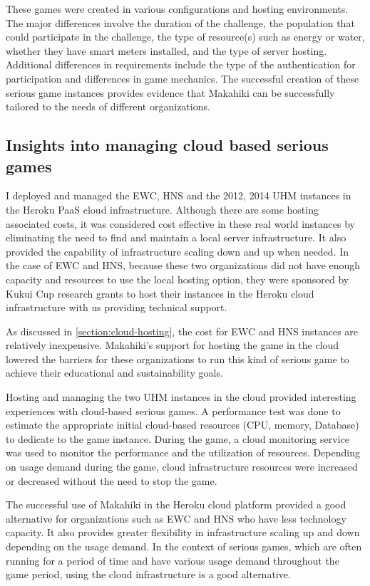 These games were created in various configurations and hosting environments. The major differences involve the duration of the challenge, the population that could participate in the challenge, the type of resource(s) such as energy or water, whether they have smart meters installed, and the type of server hosting. Additional differences in requirements include the type of the authentication for participation and differences in game mechanics.  The successful creation of these serious game instances provides evidence that Makahiki can be successfully tailored to the needs of different organizations.

\subsection{Insights into managing cloud based serious games}

I deployed and managed the EWC, HNS and the 2012, 2014 UHM instances in the Heroku PaaS cloud infrastructure. Although there are some hosting associated costs, it was considered cost effective in these real world instances by eliminating the need to find and maintain a local server infrastructure. It also provided the capability of infrastructure scaling down and up when needed. In the case of EWC and HNS, because these two organizations did not have enough capacity and resources to use the local hosting option, they were sponsored by Kukui Cup research grants to host their instances in the Heroku cloud infrastructure with us providing technical support. 

As discussed in \autoref{section:cloud-hosting}, the cost for EWC and HNS instances are relatively inexpensive. Makahiki's support for hosting the game in the cloud lowered the barriers for these organizations to run this kind of serious game to achieve their educational and sustainability goals.

Hosting and managing the two UHM instances in the cloud provided interesting experiences with cloud-based serious games. A performance test was done to estimate the appropriate initial cloud-based resources (CPU, memory, Database) to dedicate to the game instance. During the game, a cloud monitoring service was used to monitor the performance and the utilization of resources. Depending on usage demand during the game, cloud infrastructure resources were increased or decreased without the need to stop the game. 

The successful use of Makahiki in the Heroku cloud platform provided a good alternative for organizations such as EWC and HNS who have less technology capacity. It also provides greater flexibility in infrastructure scaling up and down depending on the usage demand. In the context of serious games, which are often running for a period of time and have various usage demand throughout the game period, using the cloud infrastructure is a good alternative.

